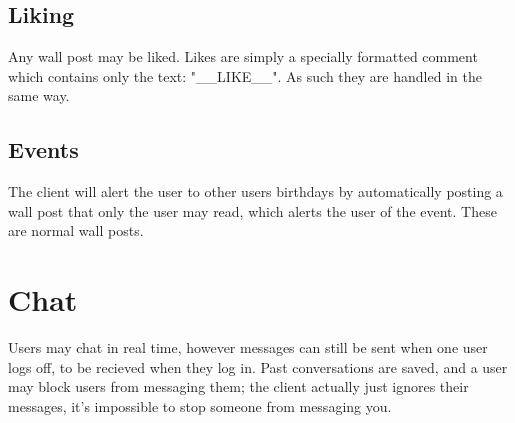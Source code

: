 \subsection{Liking}
Any wall post may be liked. Likes are simply a specially formatted comment
which contains only the text: "__LIKE__". As such they are handled in the same
way.
    
\subsection{Events}
The client will alert the user to other users birthdays by automatically posting
a wall post that only the user may read, which alerts the user of the event.
These are normal wall posts.

\section{Chat}
Users may chat in real time, however messages can still be sent when one user
logs off, to be recieved when they log in. Past conversations are saved, and a
user may block users from messaging them; the client actually just ignores their
messages, it's impossible to stop someone from messaging you.
